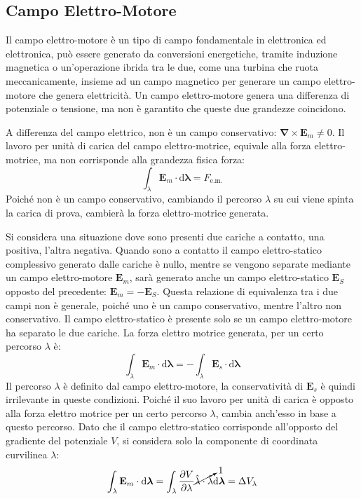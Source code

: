 \documentclass{article}
\newcommand{\vect}[1]{\boldsymbol{\mathbf{#1}}}
\newcommand{\df}{\mathrm{d}}
\numberwithin{equation}{subsection}
\begin{document}
\subsection{Campo Elettro-Motore}

Il campo elettro-motore è un tipo di campo fondamentale in elettronica ed elettronica, può essere generato da conversioni energetiche, tramite induzione magnetica o un'operazione 
ibrida tra le due, come una turbina che ruota meccanicamente, insieme ad un campo magnetico per generare un campo elettro-motore che genera elettricità. Un campo elettro-motore 
genera una differenza di potenziale o tensione, ma non è garantito che queste due grandezze coincidono. 

A differenza del campo elettrico, non è un campo conservativo: $\vect\nabla\times\vect{E}_m\neq0$. Il lavoro per unità di carica del campo elettro-motrice, equivale alla 
forza elettro-motrice, ma non corrisponde alla grandezza fisica forza:
\begin{equation*}
    \displaystyle\int_{\lambda}\vect{E}_m\cdot \df\vect{\lambda}=F_{\mathrm{e.m.}}
\end{equation*}
Poiché non è un campo conservativo, cambiando il percorso $\lambda$ su cui viene spinta la carica di prova, cambierà la forza elettro-motrice generata. 



Si considera una situazione dove sono presenti due cariche a contatto, una positiva, l'altra negativa. Quando sono a contatto il campo elettro-statico complessivo generato 
dalle cariche è nullo, mentre se vengono separate mediante un campo elettro-motore $\vect{E}_m$, sarà generato anche un campo elettro-statico $\vect{E}_S$ opposto del precedente: 
$\vect{E}_m=-\vect{E}_S$. Questa relazione di equivalenza tra i due campi non è generale, poiché uno è un campo conservativo, mentre l'altro non conservativo. Il campo 
elettro-statico è presente solo se un campo elettro-motore ha separato le due cariche. 
La forza elettro motrice generata, per un certo percorso $\lambda$ è:
\begin{equation*}
    \displaystyle\int_{\lambda}\vect{E}_m\cdot \df\vect{\lambda}=-\int_{\lambda}\vect{E}_s\cdot \df\vect{\lambda}
\end{equation*}
Il percorso $\lambda$ è definito dal campo elettro-motore, la conservatività di $\vect{E}_s$ è quindi irrilevante in queste condizioni. Poiché il suo lavoro per unità di carica 
è opposto alla forza elettro motrice per un certo percorso $\lambda$, cambia anch'esso in base a questo percorso. Dato che il campo elettro-statico corrisponde all'opposto del 
gradiente del potenziale $V$, si considera solo la componente di coordinata curvilinea $\lambda$: 
\begin{equation*}
    \displaystyle\int_{\lambda}\vect{E}_m\cdot \df\vect{\lambda}=\int_{\lambda}\frac{\partial V}{\partial\lambda}\cancelto{1}{\hat{\lambda}\cdot\hat{\lambda}}\df\vect{\lambda}=\Delta V_{\lambda}
\end{equation*}
\end{document}
